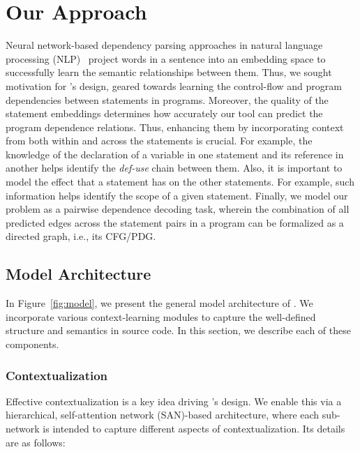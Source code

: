 \section{Our Approach}
\label{sec:approach}

Neural network-based dependency parsing approaches in natural language processing (NLP)~\cite{chen-manning-2014-fast} project words in a sentence into an embedding space to successfully learn the semantic relationships between them. Thus, we sought motivation for \tool's design, geared towards learning the control-flow and program dependencies between statements in programs. Moreover, the quality of the statement embeddings determines how accurately our tool can predict the program dependence relations. Thus, enhancing them by incorporating context from both within and across the statements is crucial. For example, the knowledge of the declaration of a variable in one statement and its reference in another helps identify the \textit{def-use} chain between them. Also, it is important to model the effect that a statement has on the other statements. For example, such information helps identify the scope of a given statement. Finally, we model our problem as a pairwise dependence decoding task, wherein the combination of all predicted edges across the statement pairs in a program can be formalized as a directed graph, i.e., its CFG/PDG.

\subsection{Model Architecture}
\label{sec:arch}

In Figure~\ref{fig:model}, we present the general model architecture of \tool. We incorporate various context-learning modules to capture the well-defined structure and semantics in source code. In this section, we describe each of these components.

\subsubsection{Contextualization}
Effective contextualization is a key idea driving \tool's design. We enable this via a hierarchical, self-attention network (SAN)-based architecture, where each sub-network is intended to capture different aspects of contextualization. Its details are as follows:

